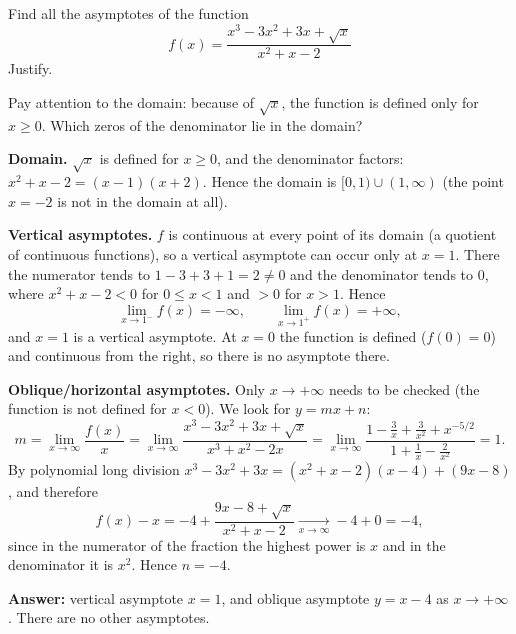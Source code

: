 
\begin{question}
Find all the asymptotes of the function
\[ f(x) = \frac{x^3 - 3x^2 + 3x + \sqrt{x}}{x^2 + x - 2} \]
Justify.
\end{question}

\begin{hint}
Pay attention to the domain: because of $\sqrt{x}$, the function is defined only for $x \ge 0$. Which zeros of the denominator lie in the domain?
\end{hint}

\begin{solution}
\textbf{Domain.} $\sqrt{x}$ is defined for $x\ge0$, and the denominator factors: $x^2 + x - 2 = (x-1)(x+2)$. Hence the domain is $[0,1)\cup(1,\infty)$
(the point $x=-2$ is not in the domain at all).

\textbf{Vertical asymptotes.} $f$ is continuous at every point of its domain (a quotient of continuous functions), so a vertical asymptote can occur only at $x=1$.
There the numerator tends to $1 - 3 + 3 + 1 = 2 \neq 0$ and the denominator tends to $0$, where $x^2+x-2 < 0$ for $0\le x<1$ and $>0$ for $x>1$. Hence
\[ \lim_{x\to1^-} f(x) = -\infty, \qquad \lim_{x\to1^+} f(x) = +\infty, \]
and $x = 1$ is a vertical asymptote. At $x=0$ the function is defined ($f(0)=0$) and continuous from the right, so there is no asymptote there.

\textbf{Oblique/horizontal asymptotes.} Only $x\to+\infty$ needs to be checked (the function is not defined for $x<0$). We look for $y = mx + n$:
\[ m = \lim_{x\to\infty}\frac{f(x)}{x} = \lim_{x\to\infty}\frac{x^3 - 3x^2 + 3x + \sqrt{x}}{x^3 + x^2 - 2x}
= \lim_{x\to\infty}\frac{1 - \frac3x + \frac3{x^2} + x^{-5/2}}{1 + \frac1x - \frac2{x^2}} = 1. \]
By polynomial long division $x^3 - 3x^2 + 3x = (x^2+x-2)(x-4) + (9x - 8)$, and therefore
\[ f(x) - x = -4 + \frac{9x - 8 + \sqrt{x}}{x^2 + x - 2} \xrightarrow[x\to\infty]{} -4 + 0 = -4, \]
since in the numerator of the fraction the highest power is $x$ and in the denominator it is $x^2$. Hence $n=-4$.

\textbf{Answer:} vertical asymptote $x = 1$, and oblique asymptote $y = x - 4$ as $x \to +\infty$. There are no other asymptotes.
\end{solution}
